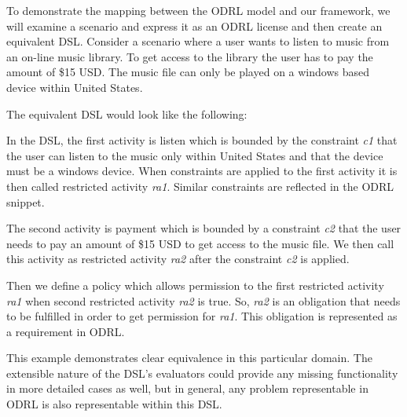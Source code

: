 To demonstrate the mapping between the ODRL model and our framework, we will examine a scenario and express it as an ODRL license and then create an equivalent DSL. Consider a scenario where a user wants to listen to music from an on-line music library. To get access to the library the user has to pay the amount of \$15 USD. The music file can only be played on a windows based device within United States.



The equivalent DSL would look like the following:



In the DSL, the first activity is listen which is bounded by the constraint {\em c1} that the user can listen to the music only within United States and that the device must be a windows device. When constraints are applied to the first activity it is then called restricted activity {\em ra1}. Similar constraints are reflected in the ODRL snippet.

The second activity is payment which is bounded by a constraint {\em c2} that the user needs to pay an amount of \$15 USD to get access to the music file. We then call this activity as restricted activity {\em ra2} after the constraint {\em c2} is applied. 

Then we define a policy which allows permission to the first restricted activity {\em ra1} when second restricted activity {\em ra2} is true. So, {\em ra2} is an obligation that needs to be fulfilled in order to get permission for {\em ra1}. This obligation is represented as a requirement in ODRL.

This example demonstrates clear equivalence in this particular domain.  The extensible nature of the DSL's evaluators could provide any missing functionality in more detailed cases as well, but in general, any problem representable in ODRL is also representable within this DSL.